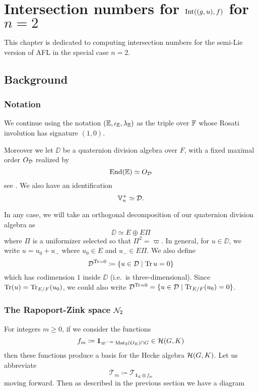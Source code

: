 \chapter{Intersection numbers for $\operatorname{Int}((g,u), f)$ for $n = 2$}
This chapter is dedicated to computing intersection numbers
for the semi-Lie version of AFL in the special case $n = 2$.

\section{Background}
\subsection{Notation}
We continue using the notation $(\mathbb E, \iota_\mathbb E, \lambda_\mathbb E)$ as the triple over $\mathbb F$
whose Rosati involution has signature $(1,0)$.

Moreover we let $\DD$ be a quaternion division algebra over $F$,
with a fixed maximal order $O_\mathcal D$ realized by
\[ \operatorname{End}(\mathbb E) \simeq O_\mathcal D \]
see \cite[Remark 2.5]{ref:KR}.
We also have an identification
\[ \mathbb V_n^+ \simeq \mathcal D. \]

In any case, we will take an orthogonal decomposition of our quaternion division algebra as
\[ \DD \simeq E \oplus E \Pi \]
where $\Pi$ is a uniformizer selected so that $\Pi^2 = \varpi$.
In general, for $u \in \DD$, we write $u = u_0 + u_-$ where $u_0 \in E$ and $u_- \in E \Pi$.
We also define
\[ \mathcal D^{\operatorname{Tr} = 0} \coloneqq \left\{ u \in \mathcal D \mid \operatorname{Tr} u = 0 \right\} \]
which has codimension $1$ inside $\DD$ (i.e.\ is three-dimensional).
Since $\operatorname{Tr}(u) = \operatorname{Tr}_{E/F}(u_0)$,
we could also write $\mathcal D^{\operatorname{Tr} = 0} = \{ u \in \mathcal D \mid \operatorname{Tr}_{E/F}(u_0) = 0 \}$.

\subsection{The Rapoport-Zink space $\mathcal N_2$}
For integers $m \ge 0$, if we consider the functions
\[ f_m \coloneqq \mathbf{1}_{\varpi^{-m} \operatorname{Mat}_2(O_E) \cap G} \in \mathcal H(G, K) \]
then these functions produce a basis for the Hecke algebra $\mathcal H(G, K)$.
Let us abbreviate
\[ \mathcal{T}_m \coloneqq \mathcal{T}_{\mathbf{1}_K \otimes f_m} \]
moving forward.
Then as described in the previous section we have a diagram
\begin{center}
\end{center}

